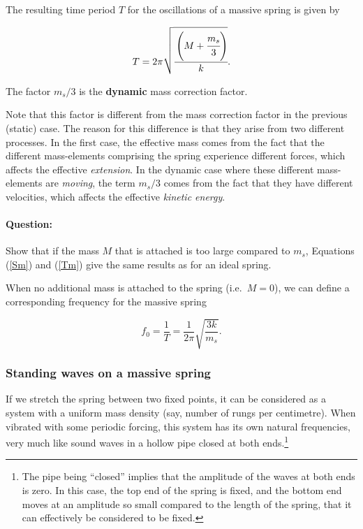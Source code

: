 \begin{refsection}
The resulting time period $T$ for the oscillations of a massive spring is given by 

\begin{equation}
T = 2\pi \sqrt{\cfrac{\left(M + \cfrac{m_s}{3}\right)}{k}}.
\label{Tm}
\end{equation}

The factor $m_s/3$ is the \textbf{dynamic} mass correction factor. 

\begin{imp}
Note that this factor is different from the mass correction factor in the previous (static) case. The reason for this difference is that they arise from two different processes. In the first case, the effective mass comes from the fact that the different mass-elements comprising the spring experience different forces, which affects the effective \textit{extension}. In the dynamic case where these different mass-elements are \textit{moving}, the term $m_s/3$ comes from the fact that they have different velocities, which affects the effective \textit{kinetic energy}.

\end{imp}

\begin{question}
\paragraph{Question:} Show that if the mass $M$ that is attached is too large compared to $m_s$, Equations (\ref{Sm}) and (\ref{Tm}) give the same results as for an ideal spring. 
\end{question}


When no additional mass is attached to the spring (i.e.\ $M=0$), we can define a corresponding frequency for the massive spring  

\begin{equation}
    f_0 = \frac{1}{T} = \frac{1}{2\pi} \sqrt{\frac{3k}{m_s}}.
\end{equation}


\subsubsection*{Standing waves on a massive spring}

If we stretch the spring between two fixed points, it can be considered as a system with a uniform mass density (say, number of rungs per centimetre). When vibrated with some periodic forcing, this system has its own natural frequencies, very much like sound waves in a hollow pipe closed at both ends.\footnote{The pipe being ``closed'' implies that the amplitude of the waves at both ends is zero. In this case, the top end of the spring is fixed, and the bottom end moves at an amplitude so small compared to the length of the spring, that it can effectively be considered to be fixed.}


\end{refsection}

